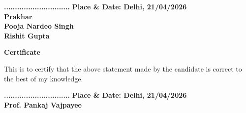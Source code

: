 \documentclass[letterpaper,11pt]{report}
\begin{document}
\textbf{..............................}\hfill
\textbf{ Place \& Date: Delhi, 21/04/2026} \\
\textbf{Prakhar}\\
\textbf{Pooja Nardeo Singh}\\
\textbf{Rishit Gupta}

\vspace{3in}

\begin{center}
\textbf{\Large Certificate} \label{section:certificate}
\end{center}

This is to certify that the above statement made by the candidate is correct to the best of my knowledge.
\\ \vspace{0.4in}

\textbf{..............................}\hfill
\textbf{ Place \& Date: Delhi, 21/04/2026} \\
\textbf{Prof. Pankaj Vajpayee}\\

\pagebreak
\end{document}

